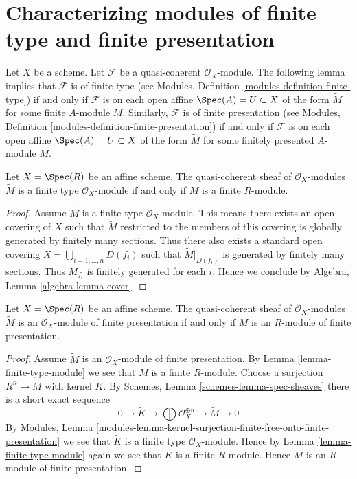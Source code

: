\section{Characterizing modules of finite type and finite presentation}
\label{section-characterizing-finite-type-presentation}

\noindent
Let $X$ be a scheme.
Let $\mathcal{F}$ be a quasi-coherent $\mathcal{O}_X$-module.
The following lemma implies that $\mathcal{F}$ is of finite type
(see Modules, Definition \ref{modules-definition-finite-type})
if and only if $\mathcal{F}$ is
on each open affine $\Spec(A) = U \subset X$
of the form $\widetilde M$ for some finite $A$-module $M$.
Similarly, $\mathcal{F}$ is of finite presentation
(see Modules, Definition \ref{modules-definition-finite-presentation})
if and only if $\mathcal{F}$ is
on each open affine $\Spec(A) = U \subset X$
of the form $\widetilde M$ for some finitely presented $A$-module $M$.

\begin{lemma}
\label{lemma-finite-type-module}
Let $X = \Spec(R)$ be an affine scheme.
The quasi-coherent sheaf of $\mathcal{O}_X$-modules
$\widetilde M$ is a finite type $\mathcal{O}_X$-module
if and only if $M$ is a finite $R$-module.
\end{lemma}

\begin{proof}
Assume $\widetilde M$ is a finite type $\mathcal{O}_X$-module.
This means there exists an open covering of $X$ such that
$\widetilde M$ restricted to the members of this covering is
globally generated by finitely many sections.
Thus there also exists a standard open covering
$X = \bigcup_{i = 1, \ldots, n} D(f_i)$ such that $\widetilde M|_{D(f_i)}$
is generated by finitely many sections. Thus $M_{f_i}$ is finitely
generated for each $i$. Hence we conclude by
Algebra, Lemma \ref{algebra-lemma-cover}.
\end{proof}

\begin{lemma}
\label{lemma-finite-presentation-module}
Let $X = \Spec(R)$ be an affine scheme. The quasi-coherent sheaf
of $\mathcal{O}_X$-modules $\widetilde M$ is an $\mathcal{O}_X$-module of
finite presentation if and only if $M$ is an $R$-module of finite presentation.
\end{lemma}

\begin{proof}
Assume $\widetilde M$ is an $\mathcal{O}_X$-module of finite presentation.
By Lemma \ref{lemma-finite-type-module} we see that $M$ is a finite $R$-module.
Choose a surjection $R^n \to M$ with kernel $K$. By
Schemes, Lemma \ref{schemes-lemma-spec-sheaves}
there is a short exact sequence
$$
0 \to \widetilde{K} \to
\bigoplus \mathcal{O}_X^{\oplus n} \to
\widetilde{M} \to 0
$$
By
Modules, Lemma
\ref{modules-lemma-kernel-surjection-finite-free-onto-finite-presentation}
we see that $\widetilde{K}$ is a finite type $\mathcal{O}_X$-module.
Hence by Lemma \ref{lemma-finite-type-module}
again we see that $K$ is a finite $R$-module.
Hence $M$ is an $R$-module of finite presentation.
\end{proof}







